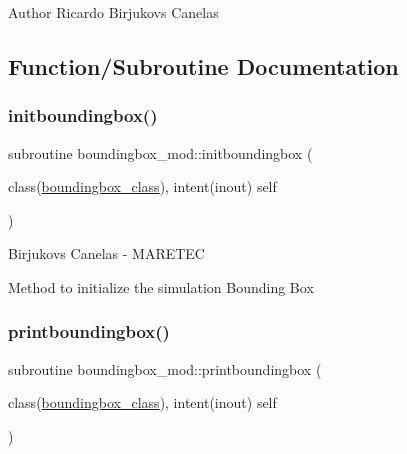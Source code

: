 \begin{DoxyAuthor}{Author}
Ricardo Birjukovs Canelas 
\end{DoxyAuthor}


\subsection{Function/\+Subroutine Documentation}
\mbox{\label{namespaceboundingbox__mod_a35e41bb92c19802441dd8d748c3acfb4}} 
\subsubsection{\texorpdfstring{initboundingbox()}{initboundingbox()}}
{\footnotesize\ttfamily subroutine boundingbox\+\_\+mod\+::initboundingbox (\begin{DoxyParamCaption}\item[{class(\hyperlink{structboundingbox__mod_1_1boundingbox__class}{boundingbox\+\_\+class}), intent(inout)}]{self }\end{DoxyParamCaption})\hspace{0.3cm}{\ttfamily [private]}}



Birjukovs Canelas -\/ M\+A\+R\+E\+T\+EC 

Method to initialize the simulation Bounding Box \mbox{\label{namespaceboundingbox__mod_a6ec461b758bc180dc72b5fb23169feca}} 
\subsubsection{\texorpdfstring{printboundingbox()}{printboundingbox()}}
{\footnotesize\ttfamily subroutine boundingbox\+\_\+mod\+::printboundingbox (\begin{DoxyParamCaption}\item[{class(\hyperlink{structboundingbox__mod_1_1boundingbox__class}{boundingbox\+\_\+class}), intent(inout)}]{self }\end{DoxyParamCaption})\hspace{0.3cm}{\ttfamily [private]}}



